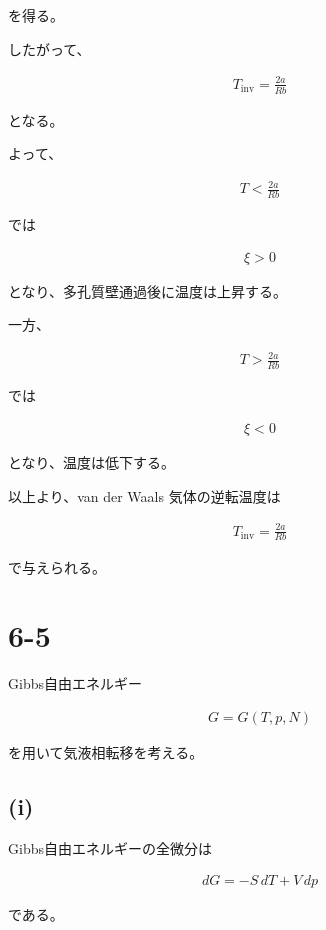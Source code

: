 \documentclass[platex,dvipdfmx,a4paper]{jsarticle}
\begin{document}
を得る。

したがって、

\begin{align*}
T_{\mathrm{inv}}
=
\frac{2a}{Rb}
\end{align*}

となる。

よって、

\begin{align*}
T
<
\frac{2a}{Rb}
\end{align*}

では

\begin{align*}
\xi>0
\end{align*}

となり、多孔質壁通過後に温度は上昇する。

一方、

\begin{align*}
T
>
\frac{2a}{Rb}
\end{align*}

では

\begin{align*}
\xi<0
\end{align*}

となり、温度は低下する。

以上より、van der Waals 気体の逆転温度は

\begin{align*}
T_{\mathrm{inv}}
=
\frac{2a}{Rb}
\end{align*}

で与えられる。
\section{6-5}

Gibbs自由エネルギー

\begin{align*}
G=G(T,p,N)
\end{align*}

を用いて気液相転移を考える。

\subsection{(i)}

Gibbs自由エネルギーの全微分は

\begin{align*}
dG
=
-S\,dT+V\,dp
\end{align*}

である。
\end{document}

